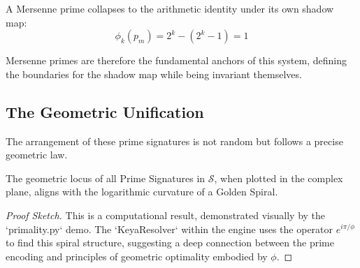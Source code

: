 \begin{corollary}
A Mersenne prime collapses to the arithmetic identity under its own shadow map:
\[
\phi_k(p_m) = 2^k - (2^k - 1) = 1
\]
\end{corollary}

Mersenne primes are therefore the fundamental anchors of this system, defining the boundaries for the shadow map while being invariant themselves.

\subsection{The Geometric Unification}

The arrangement of these prime signatures is not random but follows a precise geometric law.

\begin{theorem}
\label{thm:golden_bridge}
The geometric locus of all Prime Signatures in $\mathcal{S}$, when plotted in the complex plane, aligns with the logarithmic curvature of a Golden Spiral.
\end{theorem}

\begin{proof}[Proof Sketch]
This is a computational result, demonstrated visually by the `primality.py` demo. The `KeyaResolver` within the engine uses the operator $e^{i\pi/\phi}$ to find this spiral structure, suggesting a deep connection between the prime encoding and principles of geometric optimality embodied by $\phi$.
\end{proof}